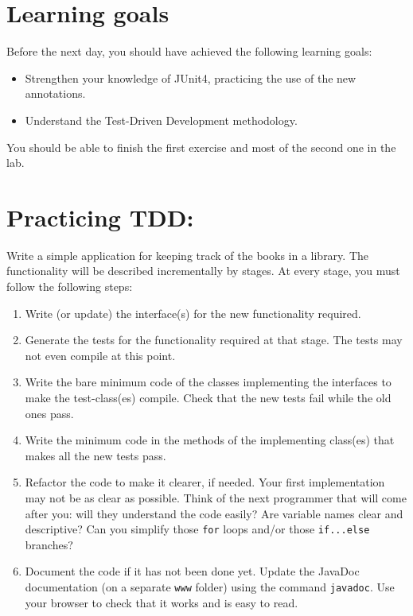 \documentclass{article}
\begin{document}

\section*{Learning goals}
\label{sec:learning-goals}

Before the next day, you should have achieved the following learning
goals: 

\begin{itemize}
\item Strengthen your knowledge of JUnit4, practicing the use of the
  new annotations.
\item Understand the Test-Driven Development methodology. 
\end{itemize}

You should be able to finish the first exercise and most of the second
one in the lab.

\section{Practicing TDD: }
\label{sec:jj}

Write a simple application for keeping track of the books in a
library. The functionality will be described incrementally by
stages. At every stage, you must follow the following steps:

\begin{enumerate}
\item Write (or update) the interface(s) for the new functionality
  required. 
\item Generate the tests for the functionality required at that
  stage. The tests may not even compile at this point.
\item Write the bare minimum code of the classes implementing the
  interfaces to make the test-class(es) compile. 
  Check that the new tests fail while the old ones pass. 
\item Write the minimum code in the methods of the implementing
  class(es) that makes all the new tests pass.  
\item Refactor the code to make it clearer, if needed. Your first
  implementation may not be as clear as possible. Think of the next
  programmer that will come after you: will they understand the code
  easily? Are variable names clear and descriptive? Can you simplify
  those \verb+for+ loops and/or those \verb+if...else+ branches?
\item Document the
  code if it has not been done yet. Update the JavaDoc documentation
  (on a separate \verb+www+ folder) using the command
  \verb+javadoc+. Use your browser to check that it works and is easy
  to read. 
\end{enumerate}
\end{document}
